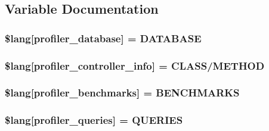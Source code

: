 \subsection{Variable Documentation}
\hypertarget{profiler__lang_8php_a93beea1bc75788ad2b7d3d3895984282}{}
\subsubsection[{\$lang}]{\setlength{\rightskip}{0pt plus 5cm}\$lang\mbox{[}\textquotesingle{}profiler\+\_\+database\textquotesingle{}\mbox{]} = \textquotesingle{}D\+A\+T\+A\+B\+A\+S\+E\textquotesingle{}}\label{profiler__lang_8php_a93beea1bc75788ad2b7d3d3895984282}
\hypertarget{profiler__lang_8php_a13e794a194b3fae4ac89472fa90a39a4}{}
\subsubsection[{\$lang}]{\setlength{\rightskip}{0pt plus 5cm}\$lang\mbox{[}\textquotesingle{}profiler\+\_\+controller\+\_\+info\textquotesingle{}\mbox{]} = \textquotesingle{}C\+L\+A\+S\+S/M\+E\+T\+H\+O\+D\textquotesingle{}}\label{profiler__lang_8php_a13e794a194b3fae4ac89472fa90a39a4}
\hypertarget{profiler__lang_8php_a542e9f6b34cf149d1574a8f6b2c9568d}{}
\subsubsection[{\$lang}]{\setlength{\rightskip}{0pt plus 5cm}\$lang\mbox{[}\textquotesingle{}profiler\+\_\+benchmarks\textquotesingle{}\mbox{]} = \textquotesingle{}B\+E\+N\+C\+H\+M\+A\+R\+K\+S\textquotesingle{}}\label{profiler__lang_8php_a542e9f6b34cf149d1574a8f6b2c9568d}
\hypertarget{profiler__lang_8php_ac8efd051248fb102a6cc0c9b418ffd6d}{}
\subsubsection[{\$lang}]{\setlength{\rightskip}{0pt plus 5cm}\$lang\mbox{[}\textquotesingle{}profiler\+\_\+queries\textquotesingle{}\mbox{]} = \textquotesingle{}Q\+U\+E\+R\+I\+E\+S\textquotesingle{}}\label{profiler__lang_8php_ac8efd051248fb102a6cc0c9b418ffd6d}
\hypertarget{profiler__lang_8php_aed0d74a29b2ef17977baa94091d06058}{}
